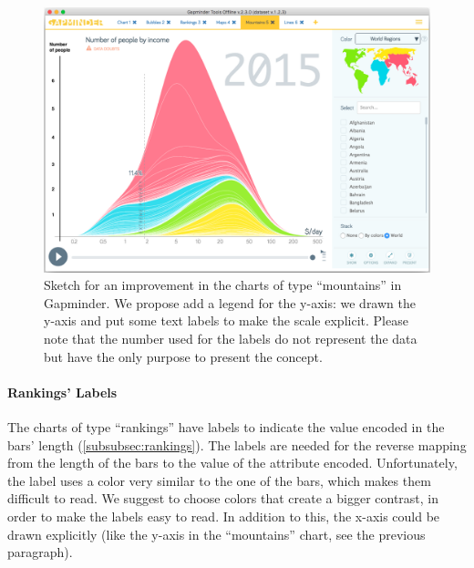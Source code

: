 \begin{figure}[h]
	\centering
	\includegraphics[width=0.95\columnwidth]{figures/mountains-y-legend}
	\caption{Sketch for an improvement in the charts of type ``mountains'' in Gapminder. We propose add a legend for the y-axis: we drawn the y-axis and put some text labels to make the scale explicit. Please note that the number used for the labels do not represent the data but have the only purpose to present the concept.}
	\label{fig:mountains-y-legend}
\end{figure}

\paragraph{Rankings' Labels}
The charts of type ``rankings'' have labels to indicate the value encoded in the bars' length (\cref{subsubsec:rankings}).
The labels are needed for the reverse mapping from the length of the bars to the value of the attribute encoded.
Unfortunately, the label uses a color very similar to the one of the bars, which makes them difficult to read.
We suggest to choose colors that create a bigger contrast, in order to make the labels easy to read.
In addition to this, the x-axis could be drawn explicitly (like the y-axis in the ``mountains'' chart, see the previous paragraph).
